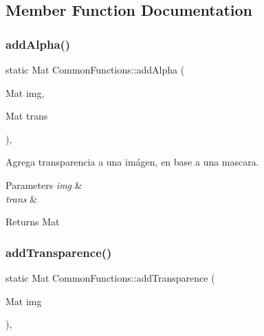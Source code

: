 \subsection{Member Function Documentation}
\mbox{\label{classCommonFunctions_acede9b6245c18d795b94b7c2261671b1}} 
\subsubsection{\texorpdfstring{add\+Alpha()}{addAlpha()}}
{\footnotesize\ttfamily static Mat Common\+Functions\+::add\+Alpha (\begin{DoxyParamCaption}\item[{Mat}]{img,  }\item[{Mat}]{trans }\end{DoxyParamCaption})\hspace{0.3cm}{\ttfamily [inline]}, {\ttfamily [static]}}



Agrega transparencia a una imágen, en base a una mascara. 


\begin{DoxyParams}{Parameters}
{\em img} & \\
\hline
{\em trans} & \\
\hline
\end{DoxyParams}
\begin{DoxyReturn}{Returns}
Mat 
\end{DoxyReturn}
\mbox{\label{classCommonFunctions_a66c8badc3cb8d173aaac77a3acdbec4c}} 
\subsubsection{\texorpdfstring{add\+Transparence()}{addTransparence()}}
{\footnotesize\ttfamily static Mat Common\+Functions\+::add\+Transparence (\begin{DoxyParamCaption}\item[{Mat}]{img }\end{DoxyParamCaption})\hspace{0.3cm}{\ttfamily [inline]}, {\ttfamily [static]}}



